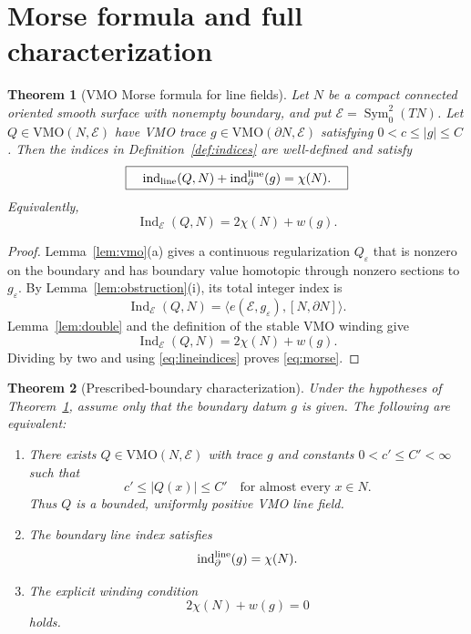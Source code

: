 \documentclass[11pt]{article}
\newtheorem{theorem}{Theorem}
\theoremstyle{definition}
\theoremstyle{remark}
\newcommand{\E}{\mathcal E}
\newcommand{\VMO}{\mathrm{VMO}}
\newcommand{\ind}{\operatorname{ind}}
\newcommand{\Ind}{\operatorname{Ind}}
\newcommand{\Sym}{\operatorname{Sym}}
\newcommand{\bd}{\partial}
\begin{document}
\section{Morse formula and full characterization}

\begin{theorem}[VMO Morse formula for line fields]\label{thm:morse}
Let $N$ be a compact connected oriented smooth surface with nonempty boundary,
and put $\E=\Sym^2_0(TN)$.  Let $Q\in\VMO(N,\E)$ have VMO trace
$g\in\VMO(\bd N,\E)$ satisfying $0<c\le |g|\le C$.  Then the indices in
Definition~\ref{def:indices} are well-defined and satisfy
\begin{equation}\label{eq:morse}
 \boxed{\quad
 \ind_{\rm line}(Q,N)+\ind^{\rm line}_{\bd}(g)=\chi(N).
 \quad}
\end{equation}
Equivalently,
\begin{equation}\label{eq:integerformula}
 \Ind_\E(Q,N)=2\chi(N)+w(g).
\end{equation}
\end{theorem}

\begin{proof}
Lemma~\ref{lem:vmo}(a) gives a continuous regularization $Q_\varepsilon$ that
is nonzero on the boundary and has boundary value homotopic through nonzero
sections to $g_\varepsilon$.  By Lemma~\ref{lem:obstruction}(i), its total
integer index is
\[
 \Ind_\E(Q,N)=\langle e(\E,g_\varepsilon),[N,\bd N]\rangle.
\]
Lemma~\ref{lem:double} and the definition of the stable VMO winding give
\[
 \Ind_\E(Q,N)=2\chi(N)+w(g).
\]
Dividing by two and using \eqref{eq:lineindices} proves \eqref{eq:morse}.
\end{proof}

\begin{theorem}[Prescribed-boundary characterization]\label{thm:extension}
Under the hypotheses of Theorem~\ref{thm:morse}, assume only that the boundary
datum $g$ is given.  The following are equivalent:
\begin{enumerate}[label=\textup{(\roman*)}]
\item There exists $Q\in\VMO(N,\E)$ with trace $g$ and constants
$0<c'\le C'<\infty$ such that
\[
 c'\le |Q(x)|\le C'\quad\text{for almost every }x\in N.
\]
Thus $Q$ is a bounded, uniformly positive VMO line field.
\item The boundary line index satisfies
\begin{equation}\label{eq:criterion-index}
 \ind^{\rm line}_{\bd}(g)=\chi(N).
\end{equation}
\item The explicit winding condition
\begin{equation}\label{eq:criterion-winding}
 2\chi(N)+w(g)=0
\end{equation}
holds.
\end{enumerate}
\end{theorem}
\end{document}
